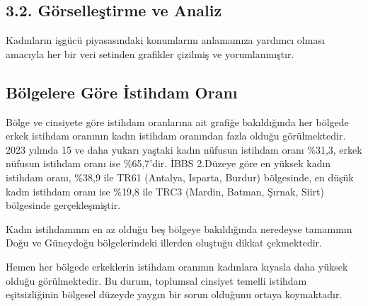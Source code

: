 \documentclass[
  11pt,
  a4paper,
  DIV=11,
  numbers=noendperiod]{scrartcl}
\begin{document}
\subsection{3.2. Görselleştirme ve
Analiz}\label{guxf6rselleux15ftirme-ve-analiz}

Kadınların işgücü piyasasındaki konumlarını anlamamıza yardımcı olması
amacıyla her bir veri setinden grafikler çizilmiş ve yorumlanmıştır.

\subsection{Bölgelere Göre İstihdam
Oranı}\label{buxf6lgelere-guxf6re-istihdam-oranux131}

Bölge ve cinsiyete göre istihdam oranlarına ait grafiğe bakıldığında her
bölgede erkek istihdam oranının kadın istihdam oranından fazla olduğu
görülmektedir. 2023 yılında 15 ve daha yukarı yaştaki kadın nüfusun
istihdam oranı \%31,3, erkek nüfusun istihdam oranı ise \%65,7'dir. İBBS
2.Düzeye göre en yüksek kadın istihdam oranı, \%38,9 ile TR61 (Antalya,
Isparta, Burdur) bölgesinde, en düşük kadın istihdam oranı ise \%19,8
ile TRC3 (Mardin, Batman, Şırnak, Siirt) bölgesinde gerçekleşmiştir.

Kadın istihdamının en az olduğu beş bölgeye bakıldığında neredeyse
tamamının Doğu ve Güneydoğu bölgelerindeki illerden oluştuğu dikkat
çekmektedir.

Hemen her bölgede erkeklerin istihdam oranının kadınlara kıyasla daha
yüksek olduğu görülmektedir. Bu durum, toplumsal cinsiyet temelli
istihdam eşitsizliğinin bölgesel düzeyde yaygın bir sorun olduğunu
ortaya koymaktadır.
\end{document}

